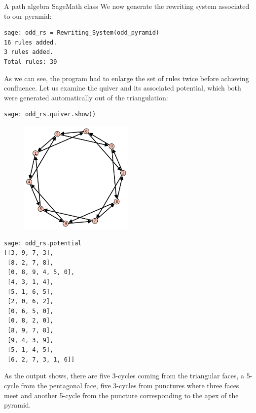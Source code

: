 \begin{chapter}{A path algebra SageMath class}
We now generate the rewriting system associated to our pyramid:
\begin{lstlisting}
sage: odd_rs = Rewriting_System(odd_pyramid)
16 rules added.
3 rules added.
Total rules: 39
\end{lstlisting}
As we can see, the program had to enlarge the set of rules twice before achieving confluence. Let us examine the quiver and its associated potential, which both were generated automatically out of the triangulation:
\begin{lstlisting}
sage: odd_rs.quiver.show()
\end{lstlisting}
\begin{figure}[h]
\centering
\includegraphics[width=0.5\textwidth]{odd_quiver.png}
\end{figure}
\begin{lstlisting}
sage: odd_rs.potential
[[3, 9, 7, 3],
 [8, 2, 7, 8],
 [0, 8, 9, 4, 5, 0],
 [4, 3, 1, 4],
 [5, 1, 6, 5],
 [2, 0, 6, 2],
 [0, 6, 5, 0],
 [0, 8, 2, 0],
 [8, 9, 7, 8],
 [9, 4, 3, 9],
 [5, 1, 4, 5],
 [6, 2, 7, 3, 1, 6]]
\end{lstlisting}
As the output shows, there are five 3-cycles coming from the triangular faces, a 5-cycle from the pentagonal face, five 3-cycles from punctures where three faces meet and another 5-cycle from the puncture corresponding to the apex of the pyramid.


\end{chapter}
